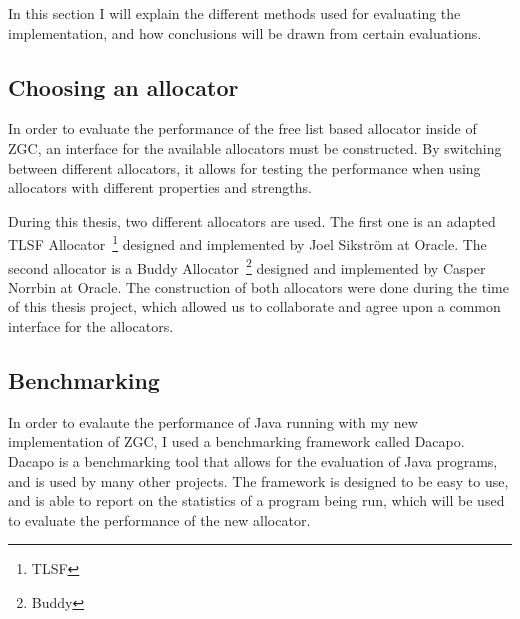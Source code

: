 In this section I will explain the different methods used for evaluating the implementation, and how conclusions will be drawn from certain evaluations.

\subsection{Choosing an allocator}
In order to evaluate the performance of the free list based allocator inside of ZGC, an interface for the available allocators must be constructed. By switching between different allocators, it allows for testing the performance when using allocators with different properties and strengths.

During this thesis, two different allocators are used. The first one is an adapted TLSF Allocator~\footnote{TLSF} designed and implemented by Joel Sikström at Oracle. The second allocator is a Buddy Allocator~\footnote{Buddy} designed and implemented by Casper Norrbin at Oracle. The construction of both allocators were done during the time of this thesis project, which allowed us to collaborate and agree upon a common interface for the allocators.

\subsection{Benchmarking}
In order to evalaute the performance of Java running with my new implementation of ZGC, I used a benchmarking framework called Dacapo. Dacapo is a benchmarking tool that allows for the evaluation of Java programs, and is used by many other projects. The framework is designed to be easy to use, and is able to report on the statistics of a program being run, which will be used to evaluate the performance of the new allocator.

